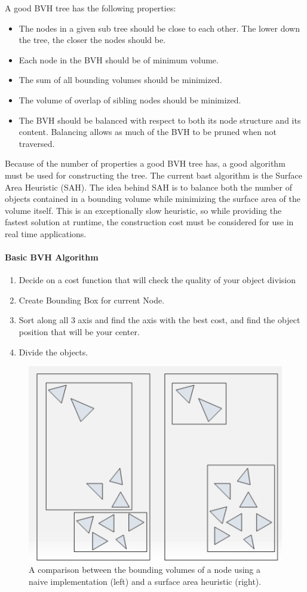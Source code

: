 \documentclass[12pt]{report}
\begin{document}
 A good BVH tree has the following properties:
 \begin{itemize}
 \item The nodes in a given sub tree should be close to each other. The lower down the tree, the closer the nodes should be.
 \item Each node in the BVH should be of minimum volume.
 \item The sum of all bounding volumes should be minimized.
 \item The volume of overlap of sibling nodes should be minimized.
 \item The BVH should be balanced with respect to both its node structure and its content. Balancing allows as much of the BVH to be pruned when not traversed.
 \end{itemize}
Because of the number of properties a good BVH tree has, a good algorithm must be used for constructing the tree.
The current bast algorithm is the Surface Area Heuristic (SAH).
The idea behind SAH is to balance both the number of objects contained in a bounding volume while minimizing the surface area of the volume itself.
This is an exceptionally slow heuristic, so while providing the fastest solution at runtime, the construction cost must be considered for use in real time applications.

\paragraph{Basic BVH Algorithm}
\begin{enumerate}
\item Decide on a cost function that will check the quality of your object division
\item Create Bounding Box for current Node.
\item Sort along all 3 axis and find the axis with the best cost, and find the object position that will be your center.
\item Divide the objects.
\end{enumerate}

\begin{figure}
\includegraphics[width=\textwidth]{sahbvh}
\caption{A comparison between the bounding volumes of a node using a naive implementation (left) and a surface area heuristic (right).}
\end{figure}
\end{document}
